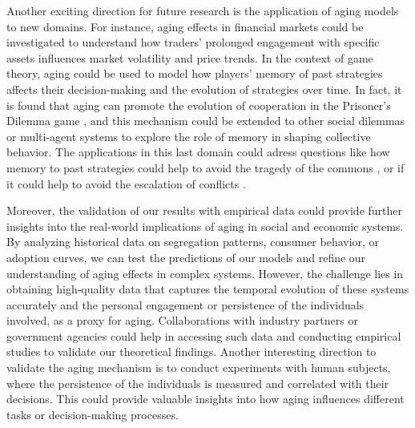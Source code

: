 Another exciting direction for future research is the application of aging models to new domains. For instance, aging effects in financial markets could be investigated to understand how traders' prolonged engagement with specific assets influences market volatility and price trends. In the context of game theory, aging could be used to model how players' memory of past strategies affects their decision-making and the evolution of strategies over time. In fact, it is found that aging can promote the evolution of cooperation in the Prisoner's Dilemma game \cite{vieira2023noisy}, and this mechanism could be extended to other social dilemmas or multi-agent systems to explore the role of memory in shaping collective behavior. The applications in this last domain could adress questions like how memory to past strategies could help to avoid the tragedy of the commons \cite{ostrom1990governing}, or if it could help to avoid the escalation of conflicts \cite{axelrod1981evolution}.

Moreover, the validation of our results with empirical data could provide further insights into the real-world implications of aging in social and economic systems. By analyzing historical data on segregation patterns, consumer behavior, or adoption curves, we can test the predictions of our models and refine our understanding of aging effects in complex systems. However, the challenge lies in obtaining high-quality data that captures the temporal evolution of these systems accurately and the personal engagement or persistence of the individuals involved, as a proxy for aging. Collaborations with industry partners or government agencies could help in accessing such data and conducting empirical studies to validate our theoretical findings. Another interesting direction to validate the aging mechanism is to conduct experiments with human subjects, where the persistence of the individuals is measured and correlated with their decisions. This could provide valuable insights into how aging influences different tasks or decision-making processes.


